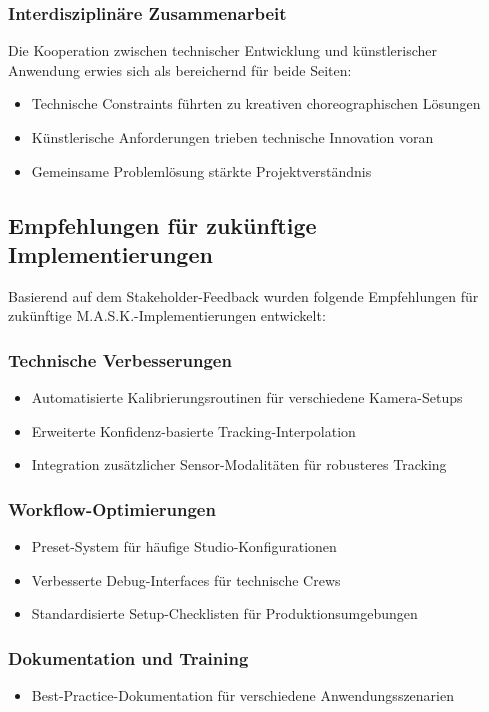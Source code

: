 \subsubsection{Interdisziplinäre Zusammenarbeit}
Die Kooperation zwischen technischer Entwicklung und künstlerischer Anwendung erwies sich als bereichernd für beide Seiten:

\begin{itemize}
    \item Technische Constraints führten zu kreativen choreographischen Lösungen
    \item Künstlerische Anforderungen trieben technische Innovation voran
    \item Gemeinsame Problemlösung stärkte Projektverständnis
\end{itemize}

\subsection{Empfehlungen für zukünftige Implementierungen}

Basierend auf dem Stakeholder-Feedback wurden folgende Empfehlungen für zukünftige M.A.S.K.-Implementierungen entwickelt:

\subsubsection{Technische Verbesserungen}
\begin{itemize}
    \item Automatisierte Kalibrierungsroutinen für verschiedene Kamera-Setups
    \item Erweiterte Konfidenz-basierte Tracking-Interpolation
    \item Integration zusätzlicher Sensor-Modalitäten für robusteres Tracking
\end{itemize}

\subsubsection{Workflow-Optimierungen}
\begin{itemize}
    \item Preset-System für häufige Studio-Konfigurationen
    \item Verbesserte Debug-Interfaces für technische Crews
    \item Standardisierte Setup-Checklisten für Produktionsumgebungen
\end{itemize}

\subsubsection{Dokumentation und Training}
\begin{itemize}
    \item Best-Practice-Dokumentation für verschiedene Anwendungsszenarien
\end{itemize}
